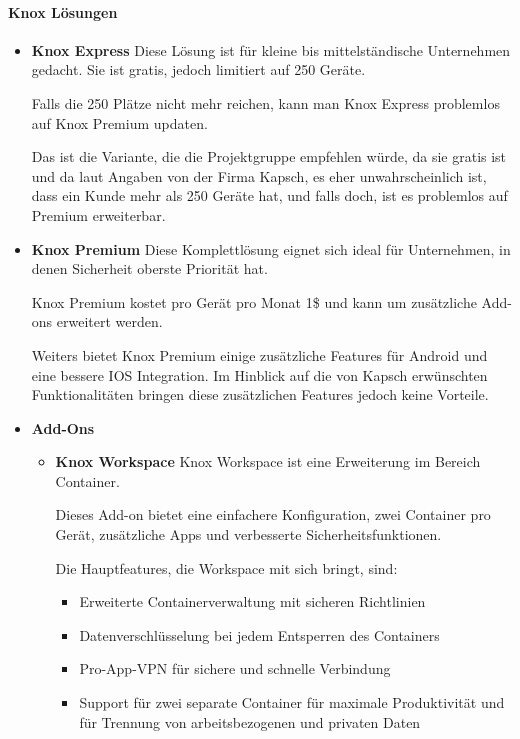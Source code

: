 \paragraph{Knox Lösungen}
\begin{itemize}
	\item \textbf{Knox Express} \newline
	Diese Lösung ist für kleine bis mittelständische Unternehmen gedacht. Sie ist gratis, jedoch limitiert auf 250 Geräte. \par Falls die 250 Plätze nicht mehr reichen, kann man Knox Express problemlos auf Knox Premium updaten. \par Das ist die Variante, die die Projektgruppe empfehlen würde, da sie gratis ist und da laut Angaben von der Firma Kapsch, es eher unwahrscheinlich ist, dass ein Kunde mehr als 250 Geräte hat, und falls doch, ist es problemlos auf Premium erweiterbar.
	\item \textbf{Knox Premium} \newline
	Diese Komplettlösung eignet sich ideal für Unternehmen, in denen Sicherheit oberste Priorität hat. \par Knox Premium kostet pro Gerät pro Monat 1\$ und kann um zusätzliche Add-ons erweitert werden. \par Weiters bietet Knox Premium einige zusätzliche Features für Android und eine bessere IOS Integration. Im Hinblick auf die von Kapsch erwünschten Funktionalitäten bringen diese zusätzlichen Features jedoch keine Vorteile.
	\item \textbf{Add-Ons}
	\begin{itemize}
		\item \textbf{Knox Workspace} \newline
		Knox Workspace ist eine Erweiterung im Bereich Container. \par Dieses Add-on bietet eine einfachere Konfiguration, zwei Container pro Gerät, zusätzliche Apps und verbesserte Sicherheitsfunktionen. \par Die Hauptfeatures, die Workspace mit sich bringt, sind: 
		\begin{itemize}
			\item Erweiterte Containerverwaltung mit sicheren Richtlinien
			\item Datenverschlüsselung bei jedem Entsperren des Containers
			\item Pro-App-VPN für sichere und schnelle Verbindung
			\item Support für zwei separate Container für maximale Produktivität und für Trennung von arbeitsbezogenen und privaten Daten

\end{itemize}
\end{itemize}
\end{itemize}
